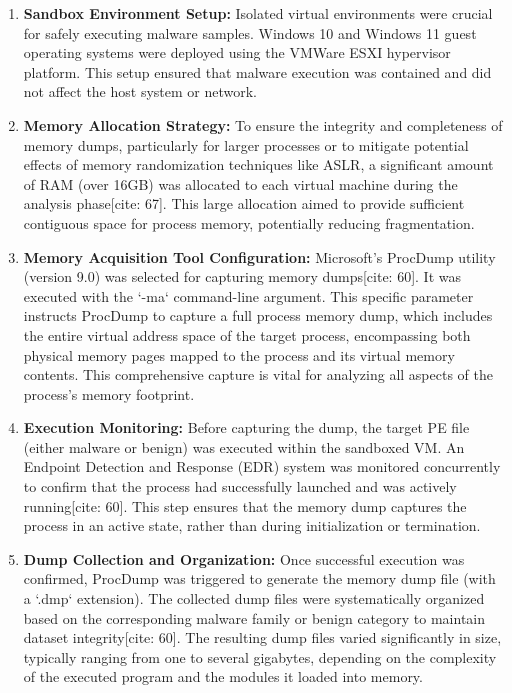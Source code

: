 \begin{enumerate}
    \item \textbf{Sandbox Environment Setup:} Isolated virtual environments were crucial for safely executing malware samples. Windows 10 and Windows 11 guest operating systems were deployed using the VMWare ESXI hypervisor platform. This setup ensured that malware execution was contained and did not affect the host system or network.
    \item \textbf{Memory Allocation Strategy:} To ensure the integrity and completeness of memory dumps, particularly for larger processes or to mitigate potential effects of memory randomization techniques like ASLR, a significant amount of RAM (over 16GB) was allocated to each virtual machine during the analysis phase[cite: 67]. This large allocation aimed to provide sufficient contiguous space for process memory, potentially reducing fragmentation.
    \item \textbf{Memory Acquisition Tool Configuration:} Microsoft's ProcDump utility (version 9.0) was selected for capturing memory dumps[cite: 60]. It was executed with the `-ma` command-line argument. This specific parameter instructs ProcDump to capture a full process memory dump, which includes the entire virtual address space of the target process, encompassing both physical memory pages mapped to the process and its virtual memory contents. This comprehensive capture is vital for analyzing all aspects of the process's memory footprint.
    \item \textbf{Execution Monitoring:} Before capturing the dump, the target PE file (either malware or benign) was executed within the sandboxed VM. An Endpoint Detection and Response (EDR) system was monitored concurrently to confirm that the process had successfully launched and was actively running[cite: 60]. This step ensures that the memory dump captures the process in an active state, rather than during initialization or termination.
    \item \textbf{Dump Collection and Organization:} Once successful execution was confirmed, ProcDump was triggered to generate the memory dump file (with a `.dmp` extension). The collected dump files were systematically organized based on the corresponding malware family or benign category to maintain dataset integrity[cite: 60]. The resulting dump files varied significantly in size, typically ranging from one to several gigabytes, depending on the complexity of the executed program and the modules it loaded into memory.
\end{enumerate}

